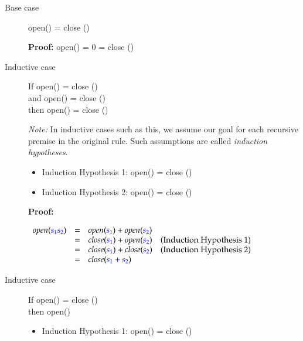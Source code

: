\documentclass{book}
\begin{document}
\begin{description}
\item[Base case] $\;$ \\ \<open(\conc{\epsilon}) = close (\conc{\epsilon})\>

  \textbf{Proof:}   \<open(\conc{\epsilon}) = 0 = close (\conc{\epsilon})\>

\item[Inductive case] $\;$ \\ If \<open() = close ()\> \\
                      and \<open() = close ()\> \\
                      then \<open() = close ()\>

  \emph{Note:} In inductive cases such as this, we assume our goal for each recursive premise
  in the original rule. Such assumptions are called \emph{induction hypotheses}. 

  \begin{itemize}
    \item Induction Hypothesis 1:  \<open() = close ()\>

    \item Induction Hypothesis 2:   \<open() = close ()\>
  \end{itemize}
  
  \textbf{Proof:} 

    $\begin{array}{lclr}
    \mathit{open}(\textcolor{blue}{s_1 s_2}) & = & \mathit{open}(\textcolor{blue}{s_1}) + \mathit{open} (\textcolor{blue}{s_2}) & \\ 
                                  & = & \mathit{close}(\textcolor{blue}{s_1}) + \mathit{open} (\textcolor{blue}{s_2}) & \text{(Induction Hypothesis 1)}\\
                                  & = & \mathit{close}(\textcolor{blue}{s_1}) + \mathit{close} (\textcolor{blue}{s_2}) & \text{(Induction Hypothesis 2)}\\
                                  & = & \mathit{close} (\textcolor{blue}{s_1 + s_2})\> \end{array}$
  
\item[Inductive case] $\;$\\
If \<open() = close ()\> \\
then \<open(\mconc{(}\mconc{)})\> 
  \begin{itemize}
  \item Induction Hypothesis 1:  \<open() = close ()\>
  \end{itemize}
    

\end{description}
\end{document}

